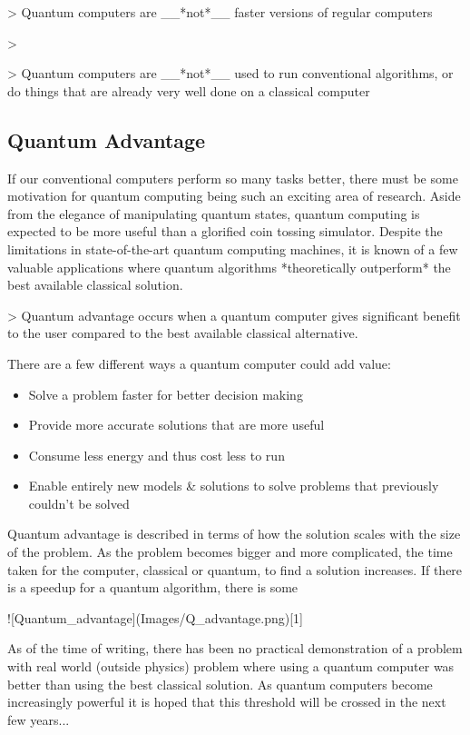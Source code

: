\documentclass{book}
\begin{document}
 > Quantum computers are __*not*__ faster versions of regular computers

 > 

 > Quantum computers are __*not*__ used to run conventional algorithms, or do things that are already very well done on a classical computer

\subsection{Quantum Advantage} 

If our conventional computers perform so many tasks better, there must be some motivation for quantum computing being such an exciting area of research. Aside from the elegance of manipulating quantum states, quantum computing is expected to be more useful than a glorified coin tossing simulator. Despite the limitations in state-of-the-art quantum computing machines, it is known of a few valuable applications where quantum algorithms *theoretically outperform* the best available classical solution.

> Quantum advantage occurs when a quantum computer gives significant benefit to the user compared to the best available classical alternative. 

There are a few different ways a quantum computer could add value: 

\begin{itemize}
    \item Solve a problem faster for better decision making
    \item Provide more accurate solutions that are more useful 
    \item Consume less energy and thus cost less to run 
    \item Enable entirely new models & solutions to solve problems that previously couldn't be solved
\end{itemize}

    

Quantum advantage is described in terms of how the solution scales with the size of the problem. As the problem becomes bigger and more complicated, the time taken for the computer, classical or quantum, to find a solution increases. If there is a speedup for a quantum algorithm, there is some 

![Quantum_advantage](Images/Q_advantage.png)[1]

As of the time of writing, there has been no practical demonstration of a problem with real world (outside physics) problem where using a quantum computer was better than using the best classical solution. As quantum computers become increasingly powerful it is hoped that this threshold will be crossed in the next few years...
\end{document}
